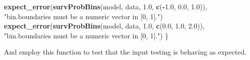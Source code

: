 \documentclass[
]{book}
\newenvironment{Shaded}{\begin{snugshade}}{\end{snugshade}}
\newcommand{\FloatTok}[1]{\textcolor[rgb]{0.00,0.00,0.81}{#1}}
\newcommand{\FunctionTok}[1]{\textcolor[rgb]{0.13,0.29,0.53}{\textbf{#1}}}
\newcommand{\NormalTok}[1]{#1}
\newcommand{\SpecialCharTok}[1]{\textcolor[rgb]{0.81,0.36,0.00}{\textbf{#1}}}
\newcommand{\StringTok}[1]{\textcolor[rgb]{0.31,0.60,0.02}{#1}}
\begin{document}
\begin{Shaded}
\begin{Highlighting}[]
  \FunctionTok{expect\_error}\NormalTok{(}\FunctionTok{survProbBins}\NormalTok{(model, data, }\FloatTok{1.0}\NormalTok{, }\FunctionTok{c}\NormalTok{(}\SpecialCharTok{{-}}\FloatTok{1.0}\NormalTok{, }\FloatTok{0.0}\NormalTok{, }\FloatTok{1.0}\NormalTok{)),}
               \StringTok{"\textasciigrave{}bin.boundaries\textasciigrave{} must be a numeric vector in [0, 1]."}\NormalTok{)}
  \FunctionTok{expect\_error}\NormalTok{(}\FunctionTok{survProbBins}\NormalTok{(model, data, }\FloatTok{1.0}\NormalTok{, }\FunctionTok{c}\NormalTok{(}\FloatTok{0.0}\NormalTok{, }\FloatTok{1.0}\NormalTok{, }\FloatTok{2.0}\NormalTok{)),}
               \StringTok{"\textasciigrave{}bin.boundaries\textasciigrave{} must be a numeric vector in [0, 1]."}\NormalTok{)}
\NormalTok{\}}
\end{Highlighting}
\end{Shaded}

And employ this function to test that the input testing is behaving as expected.
\end{document}
